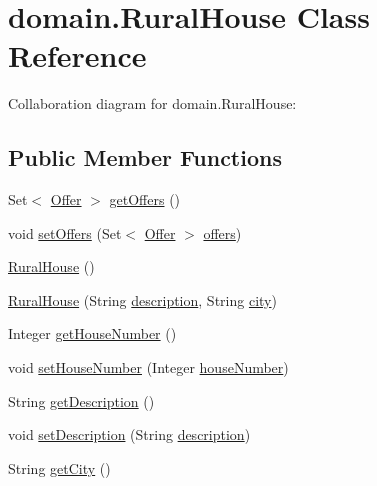 \hypertarget{classdomain_1_1RuralHouse}{}\section{domain.\+Rural\+House Class Reference}
\label{classdomain_1_1RuralHouse}


Collaboration diagram for domain.\+Rural\+House\+:
\subsection*{Public Member Functions}
\begin{DoxyCompactItemize}
\item 
Set$<$ \mbox{\hyperlink{classdomain_1_1Offer}{Offer}} $>$ \mbox{\hyperlink{classdomain_1_1RuralHouse_ab80c8a3e186714dfb11557b626ecfb1c}{get\+Offers}} ()
\item 
void \mbox{\hyperlink{classdomain_1_1RuralHouse_a240eebda76fe984b763e8eaa691f3c94}{set\+Offers}} (Set$<$ \mbox{\hyperlink{classdomain_1_1Offer}{Offer}} $>$ \mbox{\hyperlink{classdomain_1_1RuralHouse_ab96f0810763d7df5b3f38622850f941e}{offers}})
\item 
\mbox{\hyperlink{classdomain_1_1RuralHouse_a5e1f42ad6b3992bfc5fdece628455552}{Rural\+House}} ()
\item 
\mbox{\hyperlink{classdomain_1_1RuralHouse_a1052cfcd781ddfbaf6d5516737e06bf0}{Rural\+House}} (String \mbox{\hyperlink{classdomain_1_1RuralHouse_afdc9d7b70bcc6baa94cae033a5684f0e}{description}}, String \mbox{\hyperlink{classdomain_1_1RuralHouse_a4ac1bd1de58f97487abbcb8dc27a8077}{city}})
\item 
Integer \mbox{\hyperlink{classdomain_1_1RuralHouse_a849faba68dc8c0a71ed936bc509f5568}{get\+House\+Number}} ()
\item 
void \mbox{\hyperlink{classdomain_1_1RuralHouse_afae7f7702581e18517472b1faa29273d}{set\+House\+Number}} (Integer \mbox{\hyperlink{classdomain_1_1RuralHouse_a1168b2c788d2f3bca3c54eee3b8734cb}{house\+Number}})
\item 
String \mbox{\hyperlink{classdomain_1_1RuralHouse_a21b3359aa62984046a4da490fe8895e1}{get\+Description}} ()
\item 
void \mbox{\hyperlink{classdomain_1_1RuralHouse_aff9ad2c8f775b473256233e9c26456f1}{set\+Description}} (String \mbox{\hyperlink{classdomain_1_1RuralHouse_afdc9d7b70bcc6baa94cae033a5684f0e}{description}})
\item 
String \mbox{\hyperlink{classdomain_1_1RuralHouse_a67a45aa0b441b32d455d58c4a42446f1}{get\+City}} ()

\end{DoxyCompactItemize}
